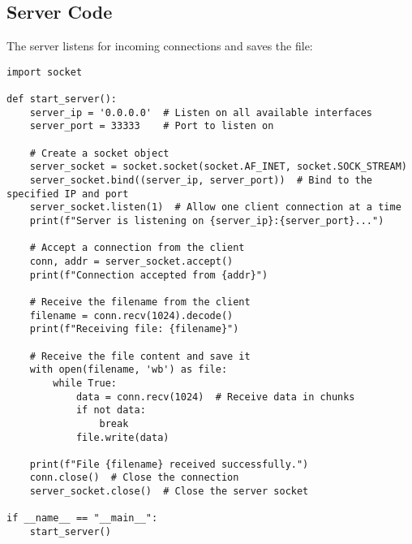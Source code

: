 \documentclass{article}
\begin{document}
\subsection{Server Code}
The server listens for incoming connections and saves the file:
\begin{verbatim}
import socket

def start_server():
    server_ip = '0.0.0.0'  # Listen on all available interfaces
    server_port = 33333    # Port to listen on

    # Create a socket object
    server_socket = socket.socket(socket.AF_INET, socket.SOCK_STREAM)
    server_socket.bind((server_ip, server_port))  # Bind to the specified IP and port
    server_socket.listen(1)  # Allow one client connection at a time
    print(f"Server is listening on {server_ip}:{server_port}...")

    # Accept a connection from the client
    conn, addr = server_socket.accept()
    print(f"Connection accepted from {addr}")

    # Receive the filename from the client
    filename = conn.recv(1024).decode()
    print(f"Receiving file: {filename}")

    # Receive the file content and save it
    with open(filename, 'wb') as file:
        while True:
            data = conn.recv(1024)  # Receive data in chunks
            if not data:
                break
            file.write(data)

    print(f"File {filename} received successfully.")
    conn.close()  # Close the connection
    server_socket.close()  # Close the server socket

if __name__ == "__main__":
    start_server()


\end{verbatim}
\end{document}

